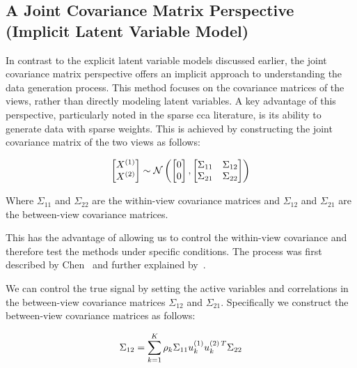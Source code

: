 \subsection{A Joint Covariance Matrix Perspective (Implicit Latent Variable Model)}\label{subsubsec:a-joint-covariance-matrix-perspective}

In contrast to the explicit latent variable models discussed earlier, the joint covariance matrix perspective offers an implicit approach to understanding the data generation process.
This method focuses on the covariance matrices of the views, rather than directly modeling latent variables.
A key advantage of this perspective, particularly noted in the sparse \acrshort{cca} literature, is its ability to generate data with sparse weights.
This is achieved by constructing the joint covariance matrix of the two views as follows:

\begin{align}\label{eq:covariance}
    \begin{bmatrix} X^{(1)} \\ X^{(2)} \end{bmatrix} \sim \mathcal{N} \left( \begin{bmatrix} 0 \\ 0 \end{bmatrix}, \begin{bmatrix} \Sigma_{11} & \Sigma_{12} \\ \Sigma_{21} & \Sigma_{22} \end{bmatrix} \right)
\end{align}

Where $\Sigma_{11}$ and $\Sigma_{22}$ are the within-view covariance matrices and $\Sigma_{12}$ and $\Sigma_{21}$ are the between-view covariance matrices.

This has the advantage of allowing us to control the within-view covariance and therefore test the methods under specific conditions.
The process was first described by Chen~\citep{chen2013sparse} and further explained by~\citep{suo2017sparse}.

We can control the true signal by setting the active variables and correlations in the between-view covariance matrices $\Sigma_{12}$ and $\Sigma_{21}$.
Specifically we construct the between-view covariance matrices as follows:

\begin{align}
    \Sigma_{12}=\sum_{k=1}^{K}\rho_k\Sigma_{11}u^{(1)}_{k}u^{(2)\,T}_k\Sigma_{22}
\end{align}

